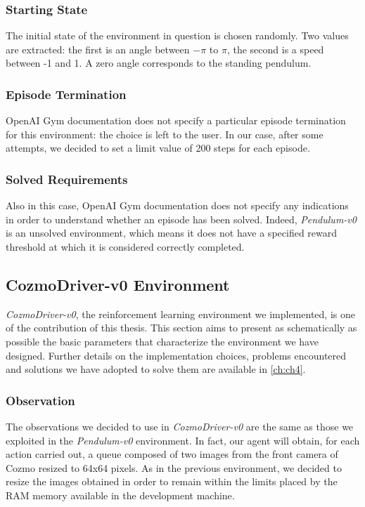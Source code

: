 \subsubsection{Starting State}

The initial state of the environment in question is chosen randomly.
Two values are extracted: the first is an angle between  $-\pi$ to $\pi$, the second is a speed between -1 and 1.
A zero angle corresponds to the standing pendulum.

\subsubsection{Episode Termination}

OpenAI Gym documentation does not specify a particular episode termination for this environment: the choice is left to the user.
In our case, after some attempts, we decided to set a limit value of 200 steps for each episode.

\subsubsection{Solved Requirements}

Also in this case, OpenAI Gym documentation does not specify any indications in order to understand whether an episode has been solved.
Indeed, \textit{Pendulum-v0} is an unsolved environment, which means it does not have a specified reward threshold at which it is considered correctly completed.

\subsection{CozmoDriver-v0 Environment}

\textit{CozmoDriver-v0}, the reinforcement learning environment we implemented, is one of the contribution of this thesis.
This section aims to present as schematically as possible the basic parameters that characterize the environment we have designed.
Further details on the implementation choices, problems encountered and solutions we have adopted to solve them are available in \vref{ch:ch4}.

\subsubsection{Observation}

The observations we decided to use in \textit{CozmoDriver-v0} are the same as those we exploited in the \textit{Pendulum-v0} environment.
In fact, our agent will obtain, for each action carried out, a queue composed of two images from the front camera of Cozmo resized to 64x64 pixels.
As in the previous environment, we decided to resize the images obtained in order to remain within the limits placed by the RAM memory available in the development machine.

